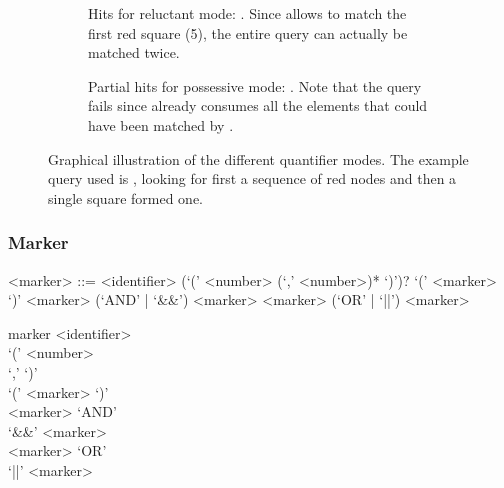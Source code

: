 \documentclass[11pt,a4paper]{report}
\begin{document}
\begin{figure}[!htb]
\begin{subfigure}{.8\textwidth}
		\caption{Hits for reluctant mode: . Since  allows  to match the first red square (5), the entire query can actually be matched twice.}
		\label{fig:reluctant-quantifier}
	\end{subfigure}
	\par\bigskip %
	\begin{subfigure}{.8\textwidth}\centering
		\caption{Partial hits for possessive mode: . Note that the query fails since  already consumes all the elements that could have been matched by .}
		\label{fig:possessive-quantifier}
	\end{subfigure}
	
	\caption[Illustration of quantification]{Graphical illustration of the different quantifier modes. The example query used is , looking for first a sequence of red nodes and then a single square formed one.}
	\label{fig:quantifier-examples}
\end{figure}

\subsubsection{Marker}
\label{sec:marker}

\begin{gram}
	\label{gram:marker}
	\begin{grammar}	
		<marker> ::= <identifier> (`(' <number> (`,' <number>)* `)')?
		\alt `(' <marker> `)'
		\alt <marker> (`AND' | `\&\&') <marker>
		\alt <marker> (`OR' | `||') <marker>
	\end{grammar}
	\diagsep
	\begin{rrdiag*}{marker}
		\sst 
		<identifier> \sst \\ `(' \srp <number> \\ `,' \erp `)' \est \\
		`(' <marker> `)' \\
		<marker> \sst `AND' \\ `\&\&' \est <marker> \\
		<marker> \sst `OR' \\ `||' \est <marker> 
		\est
	\end{rrdiag*}
\end{gram}
\end{document}
